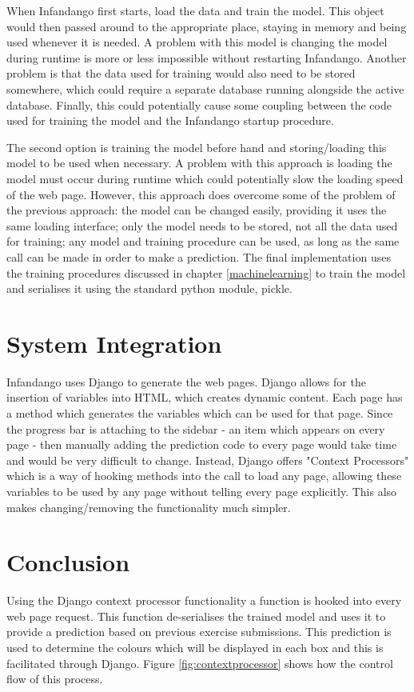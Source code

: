 When Infandango first starts, load the data and train the model. This object would then passed around to the appropriate place, staying in memory and being used whenever it is needed. A problem with this model is changing the model during runtime is more or less impossible without restarting Infandango. Another problem is that the data used for training would also need to be stored somewhere, which could require a separate database running alongside the active database. Finally, this could potentially cause some coupling between the code used for training the model and the Infandango startup procedure.

The second option is training the model before hand and storing/loading this model to be used when necessary. A problem with this approach is loading the model must occur during runtime which could potentially slow the loading speed of the web page. However, this approach does overcome some of the problem of the previous approach: the model can be changed easily, providing it uses the same loading interface; only the model needs to be stored, not all the data used for training; any model and training procedure can be used, as long as the same call can be made in order to make a prediction. The final implementation uses the training procedures discussed in chapter \ref{machinelearning} to train the model and serialises it using the standard python module, pickle.

\section{System Integration}
Infandango uses Django to generate the web pages. Django allows for the insertion of variables into HTML, which creates dynamic content. Each page has a method which generates the variables which can be used for that page. Since the progress bar is attaching to the sidebar - an item which appears on every page - then manually adding the prediction code to every page would take time and would be very difficult to change. Instead, Django offers "Context Processors" which is a way of hooking methods into the call to load any page, allowing these variables to be used by any page without telling every page explicitly. This also makes changing/removing the functionality much simpler. 




\section{Conclusion}
Using the Django context processor functionality a function is hooked into every web page request. This function de-serialises the trained model and uses it to provide a prediction based on previous exercise submissions. This prediction is used to determine the colours which will be displayed in each box and this is facilitated through Django. Figure \ref{fig:contextprocessor} shows how the control flow of this process.

